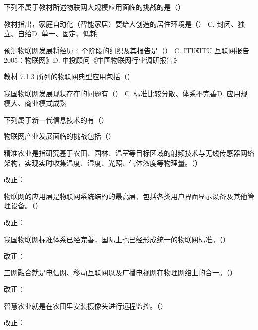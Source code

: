 \documentclass[a4paper,11pt]{article}
\begin{document}
\q 下列不属于教材所述物联网大规模应用面临的挑战的是（\quad）

\q 教材指出，家庭自动化（智能家居）要给人创造的居住环境是（\quad）
{C. 封闭、独立、自给}{D. 单一、固定、低耗}

\q 预测物联网发展将经历 4 个阶段的组织及其报告是（\quad）
{C. ITU《ITU 互联网报告 2005：物联网》}{D. 中投顾问《中国物联网行业调研报告》}

\q 教材 7.1.3 所列的物联网典型应用包括（\quad）

\q 我国物联网发展现状存在的问题有（\quad）
{C. 标准比较分散、体系不完善}{D. 应用规模大、商业模式成熟}

\q 下列属于新一代信息技术的有（\quad）

\q 物联网产业发展面临的挑战包括（\quad）

\q 精准农业是指研究基于农田、园林、温室等目标区域的射频技术与无线传感器网络架构，实现实时收集温度、湿度、光照、气体浓度等物理量。\quad（\quad）\par\noindent 改正：\fixblank

\q 物联网的应用层是物联网系统结构的最高层，包括各类用户界面显示设备及其他管理设备。\quad（\quad）\par\noindent 改正：\fixblank

\q 我国物联网标准体系已经完善，国际上也已经形成统一的物联网标准。\quad（\quad）\par\noindent 改正：\fixblank

\q 三网融合就是电信网、移动互联网以及广播电视网在物理网络上的合一。\quad（\quad）\par\noindent 改正：\fixblank

\q 智慧农业就是在农田里安装摄像头进行远程监控。\quad（\quad）\par\noindent 改正：\fixblank
\end{document}
